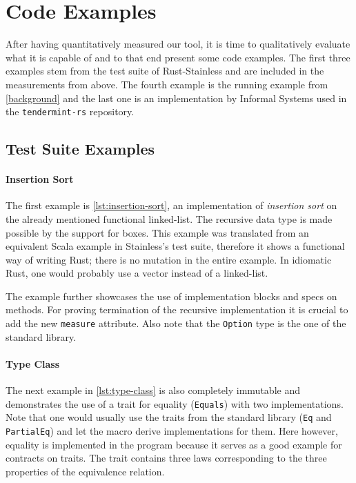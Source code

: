 


\section{Code Examples}

After having quantitatively measured our tool, it is time to qualitatively
evaluate what it is capable of and to that end present some code examples. The
first three examples stem from the test suite of Rust-Stainless and are included
in the measurements from above. The fourth example is the running example from
\autoref{background} and the last one is an implementation by Informal Systems
used in the \texttt{tendermint-rs} repository.

\subsection{Test Suite Examples}

\paragraph{Insertion Sort}

The first example is \autoref{lst:insertion-sort}, an implementation of
\emph{insertion sort} on the already mentioned functional linked-list. The
recursive data type is made possible by the support for boxes. This example was
translated from an equivalent Scala example in Stainless's test suite, therefore
it shows a functional way of writing Rust; there is no mutation in the entire
example. In idiomatic Rust, one would probably use a vector instead of a
linked-list.

The example further showcases the use of implementation blocks and specs on
methods. For proving termination of the recursive implementation it is crucial
to add the new \lstinline!measure! attribute. Also note that the
\lstinline!Option! type is the one of the standard library.

\paragraph{Type Class}

The next example in \autoref{lst:type-class} is also completely immutable and
demonstrates the use of a trait for equality (\lstinline!Equals!) with two
implementations. Note that one would usually use the traits from the standard
library (\lstinline!Eq! and \lstinline!PartialEq!) and let the macro derive
implementations for them. Here however, equality is implemented in the program
because it serves as a good example for contracts on traits. The trait contains
three laws corresponding to the three properties of the equivalence relation.

